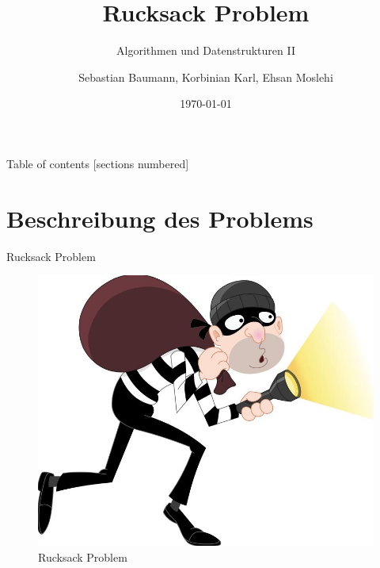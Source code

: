 \documentclass[10pt]{beamer}
\title{Rucksack Problem}
\subtitle{Algorithmen und Datenstrukturen II}
\date{\today}
\author{Sebastian Baumann, Korbinian Karl, Ehsan Moslehi}
\institute{Hochschule für Angewandte Wissenschaften München}
\begin{document}
\maketitle

\begin{frame}{Table of contents}
  [sections numbered]
  \tableofcontents[hideallsubsections]
\end{frame}

\section{Beschreibung des Problems}

\begin{frame}[fragile]{Rucksack Problem}
	\begin{figure}
		\centering
		\includegraphics[width=1\linewidth]{images/rp}
		\caption{Rucksack Problem}
		\label{fig:rp}
	\end{figure}
\end{frame}
\end{document}
